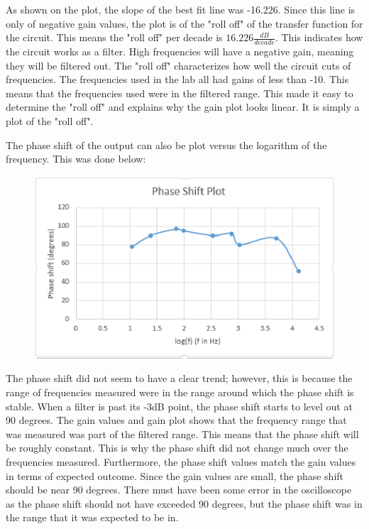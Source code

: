 \documentclass[twocolumn, amsmath]{revtex4}
\begin{document}
As shown on the plot, the slope of the best fit line was -16.226. Since this line is only of negative gain values, the plot is of the "roll off" of the transfer function for the circuit. This means the "roll off" per decade is $16.226 \frac{dB}{decade}$. This indicates how the circuit works as a filter. High frequencies will have a negative gain, meaning they will be filtered out. The "roll off" characterizes how well the circuit cuts of frequencies. The frequencies used in the lab all had gains of less than -10. This means that the frequencies used were in the filtered range. This made it easy to determine the "roll off" and explains why the gain plot looks linear. It is simply a plot of the "roll off".

The phase shift of the output can also be plot versus the logarithm of the frequency. This was done below:

\begin{figure}[h]  

\includegraphics[scale = 0.5]{phaseshift.eps}  

\end{figure}

The phase shift did not seem to have a clear trend; however, this is because the range of frequencies measured were in the range around which the phase shift is stable. When a filter is past its -3dB point, the phase shift starts to level out at 90 degrees. The gain values and gain plot shows that the frequency range that was measured was part of the filtered range. This means that the phase shift will be roughly constant. This is why the phase shift did not change much over the frequencies measured. Furthermore, the phase shift values match the gain values in terms of expected outcome. Since the gain values are small, the phase shift should be near 90 degrees. There must have been some error in the oscilloscope as the phase shift should not have exceeded 90 degrees, but the phase shift was in the range that it was expected to be in.
\end{document}
